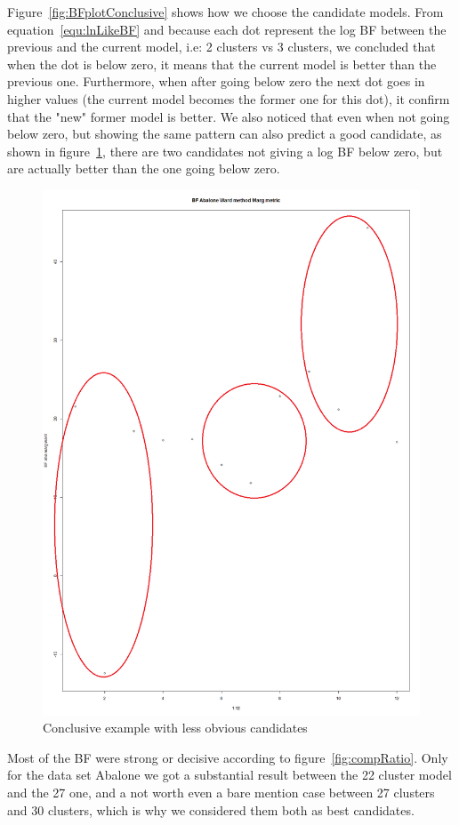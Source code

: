 \documentclass[twocolumn]{article}
\begin{document}
Figure~\ref{fig:BFplotConclusive} shows how we choose the candidate models. From equation~\ref{equ:lnLikeBF} and because each dot represent the log BF between the previous and the current model, i.e: 2 clusters vs 3 clusters, we concluded that when the dot is below zero, it means that the current model is better than the previous one. Furthermore, when after going below zero the next dot goes in higher values (the current model becomes the former one for this dot), it confirm that the "new" former model is better.
We also noticed that even when not going below zero, but showing the same pattern can also predict a good candidate, as shown in figure~\ref{fig:notbelowzero}, there are two candidates not giving a log BF below zero, but are actually better than the one going below zero.
\begin{figure}[!]
    \centering
    \includegraphics[scale=0.3]{img/BFplotNotBelowZero.png}
    \caption{Conclusive example with less obvious candidates}
    \label{fig:notbelowzero}
\end{figure}
Most of the BF were strong or decisive according to figure~\ref{fig:compRatio}. Only for the data set Abalone we got a substantial result between the 22 cluster model and the 27 one, and a not worth even a bare mention case between 27 clusters and 30 clusters, which is why we considered them both as best candidates.
\end{document}

